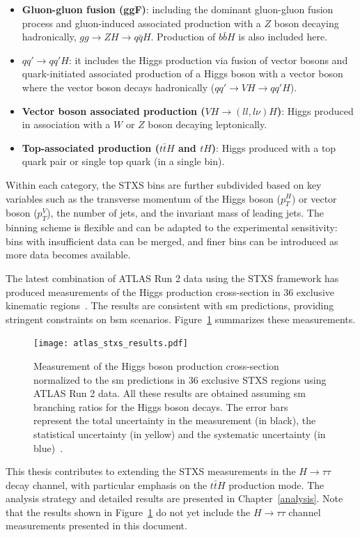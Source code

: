 \begin{itemize}
    \item \textbf{Gluon-gluon fusion (ggF)}: including the dominant gluon-gluon fusion process and gluon-induced associated production with a $Z$ boson decaying hadronically, $gg \to ZH \to q\bar{q}H$. Production of $b\bar{b}H$ is also included here.
    \item \textbf{$qq'\to qq'H$}: it includes the Higgs production via fusion of vector bosons and quark-initiated associated production of a Higgs boson with a vector boson where the vector boson decays hadronically ($qq'\to VH \to qq'H$).
    \item \textbf{Vector boson associated production ($VH \to (ll, l\nu)H$)}: Higgs produced in association with a $W$ or $Z$ boson decaying leptonically.
    \item \textbf{Top-associated production ($t\bar{t}H$ and $tH$)}: Higgs produced with a top quark pair or single top quark (in a single bin).
\end{itemize}

Within each category, the STXS bins are further subdivided based on key variables such as the transverse momentum of the Higgs boson ($p^H_T$) or vector boson ($p^V_T$), the number of jets, and the invariant mass of leading jets. The binning scheme is flexible and can be adapted to the experimental sensitivity: bins with insufficient data can be merged, and finer bins can be introduced as more data becomes available.

The latest combination of ATLAS Run 2 data using the STXS framework has produced measurements of the Higgs production cross-section in 36 exclusive kinematic regions~\cite{Nature_ATLAS}. The results are consistent with \acrshort{sm} predictions, providing stringent constraints on \acrshort{bsm} scenarios. Figure~\ref{fig:atlas-stxs-results} summarizes these measurements.

\begin{figure}[htbp]
    \centering
    \texttt{[image: atlas\_stxs\_results.pdf]}
    \caption{Measurement of the Higgs boson production cross-section normalized to the \acrshort{sm} predictions in 36 exclusive STXS regions using ATLAS Run 2 data. All these results are obtained assuming \acrshort{sm} branching ratios for the Higgs boson decays. The error bars represent the total uncertainty in the measurement (in black), the statistical uncertainty (in yellow) and the systematic uncertainty (in blue)~\cite{Nature_ATLAS}.}
    \label{fig:atlas-stxs-results}
\end{figure}

This thesis contributes to extending the STXS measurements in the $H \to \tau \tau$ decay channel, with particular emphasis on the $t\bar{t}H$ production mode. The analysis strategy and detailed results are presented in Chapter~\ref{analysis}. Note that the results shown in Figure~\ref{fig:atlas-stxs-results} do not yet include the $H \to \tau \tau$ channel measurements presented in this document.

